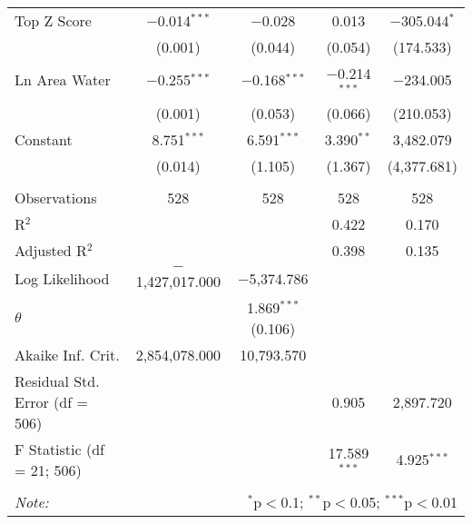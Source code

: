 \begin{table}[!htbp]
\begin{tabular}{@{\extracolsep{5pt}}lcccc}
  Top Z Score & $-$0.014$^{***}$ & $-$0.028 & 0.013 & $-$305.044$^{*}$ \\ 
  & (0.001) & (0.044) & (0.054) & (174.533) \\ 
  Ln Area Water & $-$0.255$^{***}$ & $-$0.168$^{***}$ & $-$0.214$^{***}$ & $-$234.005 \\ 
  & (0.001) & (0.053) & (0.066) & (210.053) \\ 
  Constant & 8.751$^{***}$ & 6.591$^{***}$ & 3.390$^{**}$ & 3,482.079 \\ 
  & (0.014) & (1.105) & (1.367) & (4,377.681) \\ 
 \hline \\[-1.8ex] 
Observations & 528 & 528 & 528 & 528 \\ 
R$^{2}$ &  &  & 0.422 & 0.170 \\ 
Adjusted R$^{2}$ &  &  & 0.398 & 0.135 \\ 
Log Likelihood & $-$1,427,017.000 & $-$5,374.786 &  &  \\ 
$\theta$ &  & 1.869$^{***}$  (0.106) &  &  \\ 
Akaike Inf. Crit. & 2,854,078.000 & 10,793.570 &  &  \\ 
Residual Std. Error (df = 506) &  &  & 0.905 & 2,897.720 \\ 
F Statistic (df = 21; 506) &  &  & 17.589$^{***}$ & 4.925$^{***}$ \\ 
\hline 
\hline \\[-1.8ex] 
\textit{Note:}  & \multicolumn{4}{r}{$^{*}$p$<$0.1; $^{**}$p$<$0.05; $^{***}$p$<$0.01} \\ 
\end{tabular} 
\end{table} 
